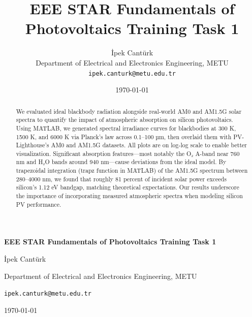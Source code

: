 \documentclass[11pt,a4paper]{article}
\title{EEE STAR Fundamentals of Photovoltaics Training Task 1 }
\author{İpek Cantürk \\ Department of Electrical and Electronics Engineering, METU \\ \texttt{ipek.canturk@metu.edu.tr}}
\date{\today}
\begin{document}
\begin{titlepage}
  \centering
  \vspace*{2cm}
  {\LARGE\bfseries EEE STAR Fundamentals of Photovoltaics Training Task 1\par}
  \vspace{1.5cm}
  {\large İpek Cantürk\par}
  {\normalsize Department of Electrical and Electronics Engineering, METU\par}
  \vspace{0.5cm}
  {\normalsize \texttt{ipek.canturk@metu.edu.tr}\par}
  {\normalsize \today\par}
  \vfill
\end{titlepage}

\begin{abstract}
We evaluated ideal blackbody radiation alongside real‐world AM0 and AM1.5G solar spectra to quantify the impact of atmospheric absorption on silicon photovoltaics. Using MATLAB, we generated spectral irradiance curves for blackbodies at 300 K, 1500 K, and 6000 K via Planck’s law across 0.1–100 µm, then overlaid them with PV-Lighthouse’s AM0 and AM1.5G datasets. All plots are on log-log scale to enable better visualization. Significant absorption features—most notably the O₂ A-band near 760 nm and H₂O bands around 940 nm—cause deviations from the ideal model. By trapezoidal integration (trapz function in MATLAB) of the AM1.5G spectrum between 280–4000 nm, we found that roughly 81 percent of incident solar power exceeds silicon’s 1.12 eV bandgap, matching theoretical expectations. Our results underscore the importance of incorporating measured atmospheric spectra when modeling silicon PV performance.
\end{abstract}
\end{document}
